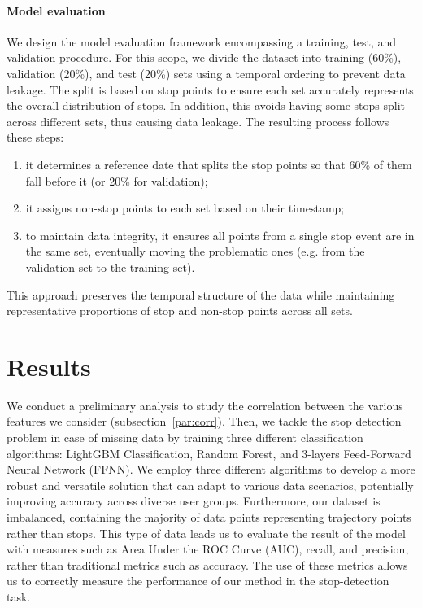 \documentclass{article}
\begin{document}
\paragraph{Model evaluation}

We design the model evaluation framework encompassing a training, test, and validation procedure. For this scope, we divide the dataset into training (60\%), validation (20\%), and test (20\%) sets using a temporal ordering to prevent data leakage. The split is based on stop points to ensure each set accurately represents the overall distribution of stops. In addition, this avoids having some stops split across different sets, thus causing data leakage. The resulting process follows these steps:
\begin{enumerate}
    \item it determines a reference date that splits the stop points so that 60\% of them fall before it (or 20\% for validation);
    \item it assigns non-stop points to each set based on their timestamp;
    \item to maintain data integrity, it ensures all points from a single stop event are in the same set, eventually moving the problematic ones (e.g. from the validation set to the training set).    
\end{enumerate}

This approach preserves the temporal structure of the data while maintaining representative proportions of stop and non-stop points across all sets.


\section{Results}
We conduct a preliminary analysis to study the correlation between the various features we consider (subsection~\ref{par:corr}).
Then, we tackle the stop detection problem in case of missing data by training three different classification algorithms: LightGBM Classification, Random Forest, and 3-layers Feed-Forward Neural Network (FFNN).
We employ three different algorithms to develop a more robust and versatile solution that can adapt to various data scenarios, potentially improving accuracy across diverse user groups.
Furthermore, our dataset is imbalanced, containing the majority of data points representing trajectory points rather than stops. This type of data leads us to evaluate the result of the model with measures such as Area Under the ROC Curve (AUC), recall, and precision, rather than traditional metrics such as accuracy. The use of these metrics allows us to correctly measure the performance of our method in the stop-detection task.
\end{document}
